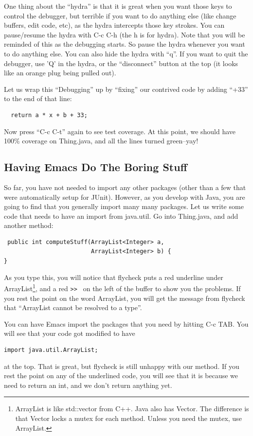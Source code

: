 \documentclass[12pt]{article}
\begin{document}
One thing about the ``hydra'' is that it is great when you want those
keys to control the debugger, but terrible if you want to do anything
else (like change buffers, edit code, etc), as the hydra intercepts
those key strokes.  You can pause/resume the hydra with C-c C-h (the h
is for hydra). Note that you will be reminded of this as the debugging
starts. So pause the hydra whenever you want to do anything else.
You can also hide the hydra with ``q''.  If you want to quit the debugger,
use 'Q' in the hydra, or the ``disconnect'' button at the top (it looks like
an orange plug being pulled out).

Let us wrap this ``Debugging'' up by ``fixing'' our contrived code
by adding ``+33'' to the end of that line:
\begin{verbatim}
  return a * x + b + 33;
\end{verbatim}

Now press ``C-c C-t'' again to see test coverage.   At this point, we should
have 100\% coverage on Thing.java, and all the lines turned green--yay!


\subsection{Having Emacs Do The Boring Stuff}
So far, you have not needed to import any other packages (other than
a few that were automatically setup for JUnit).  However, as
you develop with Java, you are going to find that you generally import
many many packages.  Let us write some code that needs to have
an import from java.util.  Go into Thing.java, and add another method:

\begin{verbatim}
 public int computeStuff(ArrayList<Integer> a, 
                         ArrayList<Integer> b) {
}
\end{verbatim}

As you type this, you will notice that flycheck puts a red underline
under ArrayList\footnote{ArrayList is like std::vector from C++. Java
  also has Vector.  The difference is that Vector locks a mutex for
  each method.  Unless you need the mutex, use ArrayList.}, and a red
\verb+>> + on the left of the buffer to show you the problems. If you
rest the point on the word ArrayList, you will get the message from
flycheck that ``ArrayList cannot be resolved to a type''.

You can have Emacs import the packages that you
need by hitting C-c TAB. You will see that your code got modified
to have  
\begin{verbatim}
import java.util.ArrayList;
\end{verbatim}
at the top. That is great, but flycheck is still unhappy with our method.
If you rest the point on any of the underlined code, you will see that
it is because we need to return an int, and we don't return anything yet.
\end{document}
